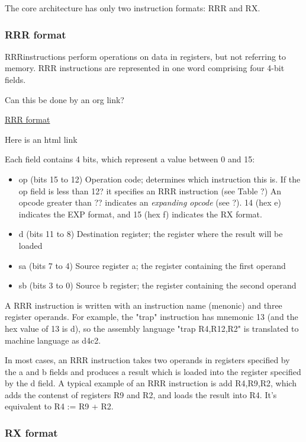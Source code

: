 \documentclass[11pt]{article}
\begin{document}
The core architecture has only two instruction formats: RRR and RX.

\subsubsection*{RRR format}
\label{sec:org0b57e55}

RRRinstructions perform operations on data in registers, but not
referring to memory.  RRR instructions are represented in one word
comprising four 4-bit fields.

Can this be done by an org link?

\href{svg/RRRformat.svg}{RRR format}

Here is an html link

Each field contains 4 bits, which represent a value between 0 and 15:

\begin{itemize}
\item op (bits 15 to 12) Operation code; determines which instruction this
is.  If the op field is less than 12? it specifies an RRR
instruction (see Table ?)  An opcode greater than ?? indicates an
\emph{expanding opcode} (see ?).  14 (hex e) indicates the EXP format,
and 15 (hex f) indicates the RX format.
\item d (bits 11 to 8) Destination register; the register where the result
will be loaded
\item sa (bits 7 to 4) Source register a; the register containing the
first operand
\item sb  (bits 3 to 0) Source b register; the register containing the
second operand
\end{itemize}



A RRR instruction is written with an instruction name (menonic) and
three register operands.  For example, the "trap" instruction has
mnemonic 13 (and the hex value of 13 is d), so the assembly language
"trap R4,R12,R2" is translated to machine language as d4c2.

In most cases, an RRR instruction takes two operands in registers
specified by the a and b fields and produces a result which is loaded
into the register specified by the d field.  A typical example of an
RRR instruction is add R4,R9,R2, which adds the contenst of registers
R9 and R2, and loads the result into R4.  It's equivalent to R4 :=
R9 + R2.

\subsubsection*{RX format}
\label{sec:org0bd1648}
\end{document}
